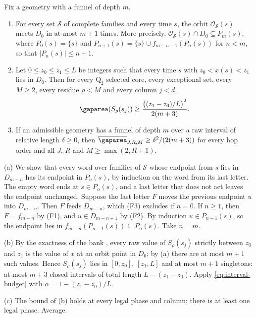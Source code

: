 \begin{lemma}\label{lem:funnel-area}
Fix a geometry with a funnel of depth $m$.
\begin{enumerate}[label=(\alph*)]
\item For every set $\mathcal S$ of complete families and every time $s$, the orbit
$\mathcal O_{\mathcal S}(s)$ meets $D_0$ in at most $m+1$ times. More precisely,
$\mathcal O_{\mathcal S}(s)\cap D_0\subseteq P_m(s)$, where $P_0(s)=\{s\}$ and
$P_{n+1}(s)=\{s\}\cup f_{m-n-1}(P_n(s))$ for $n<m$, so that $|P_n(s)|\le n+1$.
\item Let $0\le z_0\le z_1\le L$ be integers such that every time $s$ with
$z_0<x(s)<z_1$ lies in $D_0$. Then for every $\mathrm Q_2$ selected core, every
exceptional set, every $M\ge2$, every residue $\rho<M$ and every column $j<d$,
\[
 \gaparea(S_\rho(s_j))\ge\frac{\bigl((z_1-z_0)/L\bigr)^2}{2(m+3)}.
\]
\item If an admissible geometry has a funnel of depth $m$ over a raw interval of
relative length $\delta\ge0$, then $\meanarea_{J,R,M}\ge\delta^2/(2(m+3))$ for every
hop order and all $J$, $R$ and $M\ge\max(2,R+1)$.
\end{enumerate}
\end{lemma}

\begin{outline}
(a) We show that every word over families of $\mathcal S$ whose endpoint from $s$ lies
in $D_{m-n}$ has its endpoint in $P_n(s)$, by induction on the word from its last
letter. The empty word ends at $s\in P_n(s)$, and a last letter that does not act
leaves the endpoint unchanged. Suppose the last letter $F$ moves the previous endpoint
$u$ into $D_{m-n}$. Then $F$ feeds $D_{m-n}$, which (F3) excludes if $n=0$. If
$n\ge1$, then $F=f_{m-n}$ by (F1), and $u\in D_{m-n+1}$ by (F2). By induction
$u\in P_{n-1}(s)$, so the endpoint lies in $f_{m-n}(P_{n-1}(s))\subseteq P_n(s)$.
Take $n=m$.

(b) By the exactness of the bank \cite[Theorem~2.7]{SourceCovers2026}, every raw value
of $S_\rho(s_j)$ strictly between $z_0$ and $z_1$ is the value of $x$ at an orbit
point in $D_0$; by (a) there are at most $m+1$ such values. Hence $S_\rho(s_j)$ lies in
$[0,z_0]$, $[z_1,L]$ and at most $m+1$ singletons: at most $m+3$ closed intervals of
total length $L-(z_1-z_0)$. Apply \eqref{eq:interval-budget} with
$\alpha=1-(z_1-z_0)/L$.

(c) The bound of (b) holds at every legal phase and column; there is at least one
legal phase. Average.
\end{outline}

